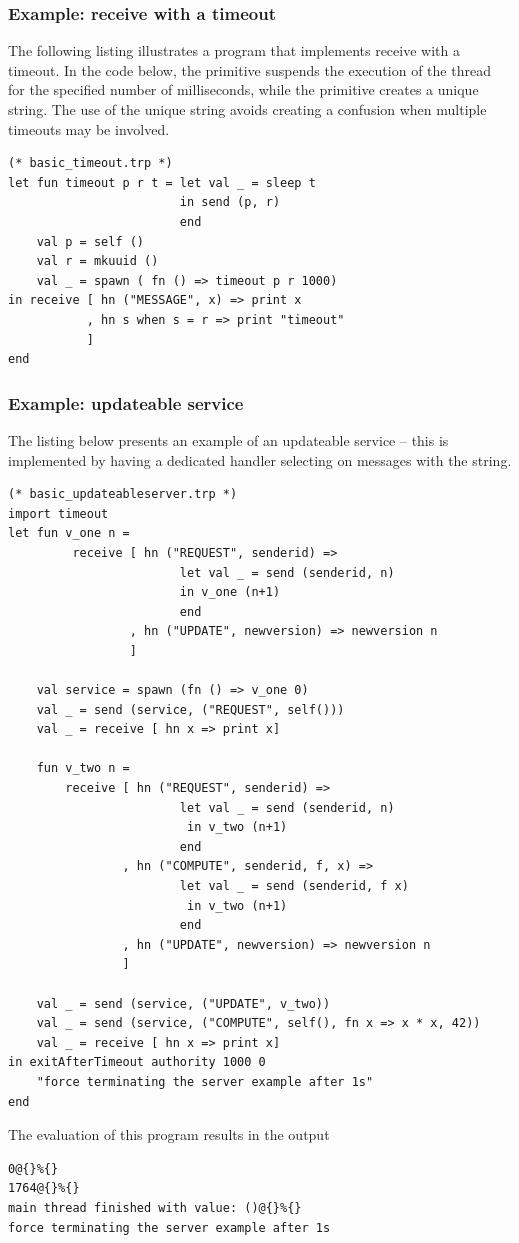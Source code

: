 \subsubsection{Example: receive with a timeout}
The following listing illustrates a program that implements
receive with a timeout. In the code below, the primitive 
suspends the execution of the thread for the specified number of milliseconds,
while the primitive  creates a unique string.
The use of the unique string avoids creating a confusion when multiple
timeouts may be involved.
\begin{lstlisting}
(* basic_timeout.trp *)
let fun timeout p r t = let val _ = sleep t
                        in send (p, r)
                        end
    val p = self ()
    val r = mkuuid ()
    val _ = spawn ( fn () => timeout p r 1000)
in receive [ hn ("MESSAGE", x) => print x
           , hn s when s = r => print "timeout"
           ]
end
\end{lstlisting}


\subsubsection{Example: updateable service}
The listing below presents an example of an updateable service --
this is implemented by having a dedicated handler selecting on
messages with the  string.

\begin{lstlisting}
(* basic_updateableserver.trp *)
import timeout
let fun v_one n =
         receive [ hn ("REQUEST", senderid) =>
                        let val _ = send (senderid, n)
                        in v_one (n+1)
                        end
                 , hn ("UPDATE", newversion) => newversion n
                 ]

    val service = spawn (fn () => v_one 0)
    val _ = send (service, ("REQUEST", self()))
    val _ = receive [ hn x => print x]

    fun v_two n =
        receive [ hn ("REQUEST", senderid) =>
                        let val _ = send (senderid, n)
                         in v_two (n+1)
                        end
                , hn ("COMPUTE", senderid, f, x) =>
                        let val _ = send (senderid, f x)
                         in v_two (n+1)
                        end
                , hn ("UPDATE", newversion) => newversion n
                ]

    val _ = send (service, ("UPDATE", v_two))
    val _ = send (service, ("COMPUTE", self(), fn x => x * x, 42))
    val _ = receive [ hn x => print x]
in exitAfterTimeout authority 1000 0
    "force terminating the server example after 1s"
end
\end{lstlisting}
The evaluation of this program results in the output
\begin{verbatim}
0@{}%{}
1764@{}%{}
main thread finished with value: ()@{}%{}
force terminating the server example after 1s
\end{verbatim}



